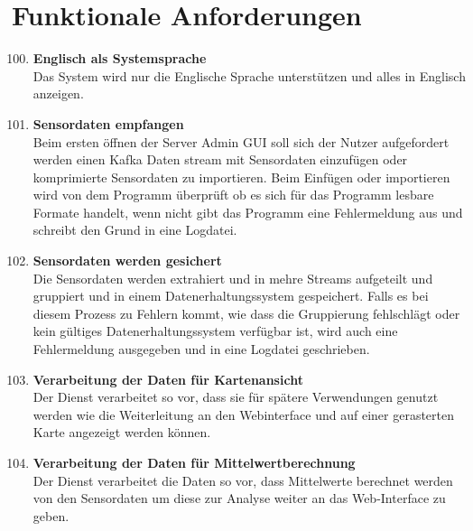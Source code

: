 \chapter{Funktionale Anforderungen}
\begin{enumerate}[label=\textbf{PF\arabic{enumi}0}]
	\setcounter{enumi}{99}
	\section{Pflicht Funktionale Anforderungen}
	\subsection{Server}

	\item \textbf{Englisch als Systemsprache}\\
		Das System wird nur die Englische Sprache unterstützen und alles in Englisch anzeigen. 
	
	\item \textbf{Sensordaten empfangen} \label{A1}\\
		Beim ersten öffnen der Server Admin GUI soll sich der Nutzer aufgefordert werden einen Kafka Daten stream mit Sensordaten einzufügen oder komprimierte Sensordaten zu importieren. Beim Einfügen oder importieren wird von dem Programm überprüft ob es sich für das Programm lesbare Formate handelt, wenn nicht gibt das Programm eine Fehlermeldung aus und schreibt den Grund in eine Logdatei.  
		
	\item \textbf{Sensordaten werden gesichert}\\
		Die Sensordaten werden extrahiert und in mehre Streams aufgeteilt und gruppiert und in einem Datenerhaltungssystem gespeichert. Falls es bei diesem Prozess zu Fehlern kommt, wie dass die Gruppierung fehlschlägt oder kein gültiges Datenerhaltungssystem verfügbar ist, wird auch eine Fehlermeldung ausgegeben und in eine Logdatei geschrieben.
		
	\item \textbf{Verarbeitung der Daten für Kartenansicht} \label{FAKarten}\\
		Der Dienst verarbeitet so vor, dass sie für spätere Verwendungen genutzt werden wie die Weiterleitung an den Webinterface und auf einer gerasterten Karte angezeigt werden können.
	
	\item \textbf{Verarbeitung der Daten für Mittelwertberechnung} \label{FAMittel}\\
		Der Dienst verarbeitet die Daten so vor, dass Mittelwerte berechnet werden von den Sensordaten um diese zur Analyse weiter an das Web-Interface zu geben.
	

\end{enumerate}
